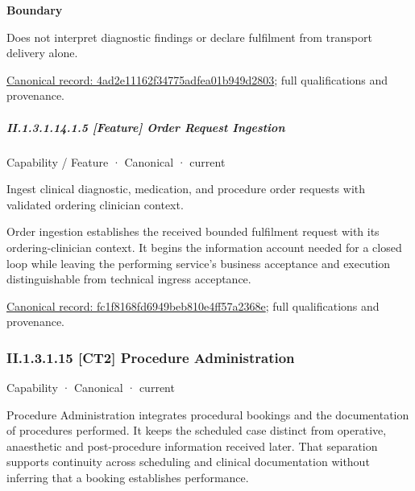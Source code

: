 \textbf{Boundary}



Does not interpret diagnostic findings or declare fulfilment from transport delivery alone.


{\footnotesize \href{../../../../continuum/strategy/capability/feature/4ad2e11162f34775adfea01b949d2803.md}{Canonical record: 4ad2e11162f34775adfea01b949d2803}; full qualifications and provenance.}\par
\subparagraph*{II.1.3.1.14.1.5 [Feature] Order Request Ingestion}
\label{navigation:II.1.3.1.14.1.5}

\label{element:fc1f8168fd6949beb810e4ff57a2368e}
{\small Capability / Feature · Canonical · current}\par

Ingest clinical diagnostic, medication, and procedure order requests with validated ordering clinician context.



Order ingestion establishes the received bounded fulfilment request with its ordering-clinician context. It begins the information account needed for a closed loop while leaving the performing service's business acceptance and execution distinguishable from technical ingress acceptance.


{\footnotesize \href{../../../../continuum/strategy/capability/feature/fc1f8168fd6949beb810e4ff57a2368e.md}{Canonical record: fc1f8168fd6949beb810e4ff57a2368e}; full qualifications and provenance.}\par
\subsubsection*{II.1.3.1.15 [CT2] Procedure Administration}
\label{navigation:II.1.3.1.15}

\label{element:649dd7cc26094e539386a050086dfb91}
{\small Capability · Canonical · current}\par

Procedure Administration integrates procedural bookings and the documentation of procedures performed. It keeps the scheduled case distinct from operative, anaesthetic and post-procedure information received later. That separation supports continuity across scheduling and clinical documentation without inferring that a booking establishes performance.



